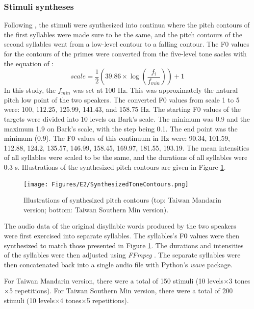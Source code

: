 \documentclass[12pt]{report}
\begin{document}
\begin{CJK}{UTF8}{bsmi}
\subsubsection{Stimuli syntheses}
Following \cite{Zhangetal2022}, the stimuli were synthesized into continua where the pitch contours of the first syllables were made sure to be the same, and the pitch contours of the second syllables went from a low-level contour to a falling contour. The F0 values for the contours of the primes were converted from the five-level tone sacles with the equation of \cite{FonChiang1999}:
\[scale = \dfrac{1}{2}(39.86\times \log (\dfrac{f_{i}}{f_{min}})) + 1\] In this study, the $f_{min}$ was set at 100 Hz. This was approximately the natural pitch low point of the two speakers. The converted F0 values from scale 1 to 5 were: 100, 112.25, 125.99, 141.43, and 158.75 Hz. The starting F0 values of the targets were divided into 10 levels on Bark's scale. The minimum was 0.9 and the maximum 1.9 on Bark's scale, with the step being 0.1. The end point was the minimum (0.9). The F0 values of this continuum in Hz were: 90.34, 101.59, 112.88, 124.2, 135.57, 146.99, 158.45, 169.97, 181.55, 193.19. The mean intensities of all syllables were scaled to be the same, and the durations of all syllables were 0.3 s. Illustrations of the synthesized pitch contours are given in Figure \ref{Figure:SynthesizedToneContours}.

\begin{figure}[h]
\centering
\texttt{[image: Figures/E2/SynthesizedToneContours.png]}
\caption{Illustrations of synthesized pitch contours (top: Taiwan Mandarin version; bottom: Taiwan Southern Min version).}
\label{Figure:SynthesizedToneContours}
\end{figure}

The audio data of the original disyllabic words produced by the two speakers were first exercised into separate syllables. The syllables's F0 values were then synthesized to match those presented in Figure \ref{Figure:SynthesizedToneContours}. The durations and intensities of the syllables were then adjusted using \textit{FFmpeg} \citep{Tomar2006}. The separate syllables were then concatenated back into a single audio file with Python's \textit{wave} package.

For Taiwan Mandarin version, there were a total of 150 stimuli (10 levels$\times$3 tones$\times$5 repetitions). For Taiwan Southern Min version, there were a total of 200 stimuli (10 levels$\times$4 tones$\times$5 repetitions).


\end{CJK}
\end{document}
